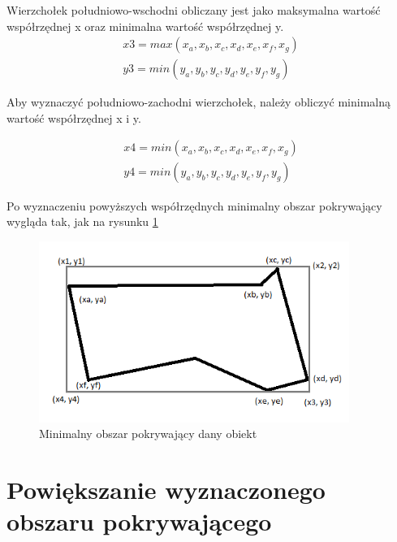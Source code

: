 Wierzchołek południowo-wschodni obliczany jest jako maksymalna wartość współrzędnej x oraz minimalna wartość współrzędnej y.
\begin{equation} \label{sec:czwartyWierzcholek}
\begin{split}
x3 = max(x_a, x_b, x_c, x_d, x_e, x_f, x_g) \\
y3 = min(y_a, y_b, y_c, y_d, y_e, y_f, y_g)
\end{split}
\end{equation}\newline

Aby wyznaczyć południowo-zachodni wierzchołek, należy obliczyć minimalną wartość współrzędnej x i y.

\begin{equation} \label{sec:pierwszyWierzcholek}
\begin{split}
x4 = min(x_a, x_b, x_c, x_d, x_e, x_f, x_g) \\
y4 = min(y_a, y_b, y_c, y_d, y_e, y_f, y_g)
\end{split}
\end{equation}\newline

Po wyznaczeniu powyższych współrzędnych minimalny obszar pokrywający wygląda tak, jak na rysunku \ref{sec:secondtBB}


\begin{figure}[h]
\caption{Minimalny obszar pokrywający dany obiekt}
\label{sec:secondtBB}
\centering
\includegraphics[width=0.9\textwidth]{minBoundingBox}
\end{figure}

\newpage
\section{Powiększanie wyznaczonego obszaru pokrywającego}
\label{sec:Powiększanie wyznaczonegoobszarupokrywającego}

